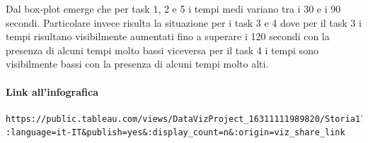 Dal box-plot emerge che per task 1, 2 e 5 i tempi medi variano tra i 30 e i 90 secondi. Particolare invece risulta la situazione per i task 3 e 4 dove per il task 3 i tempi risultano visibilmente aumentati fino a superare i 120 secondi con la presenza di alcuni tempi molto bassi viceversa per il task 4 i tempi sono visibilmente bassi con la presenza di alcuni tempi molto alti.  

\paragraph{Link all'infografica}
\begin{verbatim}
https://public.tableau.com/views/DataVizProject_16311111989820/Storia1?
:language=it-IT&publish=yes&:display_count=n&:origin=viz_share_link
\end{verbatim}